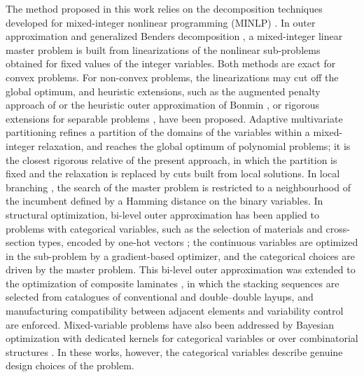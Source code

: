 \documentclass[pdflatex,sn-basic]{sn-jnl}
\begin{document}
The method proposed in this work relies on the decomposition techniques
developed for mixed-integer nonlinear programming (MINLP)
\citep{belotti2013}. In outer approximation \citep{duran1986,fletcher1994} and
generalized Benders decomposition \citep{benders1962,geoffrion1972}, a
mixed-integer linear master problem is built from linearizations of the
nonlinear sub-problems obtained for fixed values of the integer variables. Both
methods are exact for convex problems. For non-convex problems, the
linearizations may cut off the global optimum, and heuristic extensions, such as
the augmented penalty approach of \citet{viswanathan1990} or the heuristic
outer approximation of Bonmin \citep{bonami2008}, or rigorous extensions for
separable problems \citep{kesavan2004}, have been proposed. Adaptive
multivariate partitioning \citep{nagarajan2019} refines a partition of the
domains of the variables within a mixed-integer relaxation, and reaches the
global optimum of polynomial problems; it is the closest rigorous relative of
the present approach, in which the partition is fixed and the relaxation is
replaced by cuts built from local solutions. In local
branching \citep{fischetti2003}, the search of the master problem is restricted to
a neighbourhood of the incumbent defined by a Hamming distance on the binary
variables. In structural optimization, bi-level outer approximation has been
applied to problems with categorical variables, such as the selection of
materials and cross-section types, encoded by one-hot vectors
\citep{barjhoux2020,barjhoux2022}; the continuous variables are optimized in the
sub-problem by a gradient-based optimizer, and the categorical choices are
driven by the master problem. This bi-level outer approximation was extended to the optimization of
composite laminates \citep{garciapis2025thesis,garciapis2025}, in which the
stacking sequences are selected from catalogues of conventional and
double--double layups, and manufacturing compatibility between adjacent
elements and variability control are enforced. Mixed-variable problems have also been addressed
by Bayesian optimization with dedicated kernels for categorical variables
\citep{pelamatti2019} or over combinatorial structures \citep{baptista2018}. In these works, however, the categorical variables
describe genuine design choices of the problem.
\end{document}
